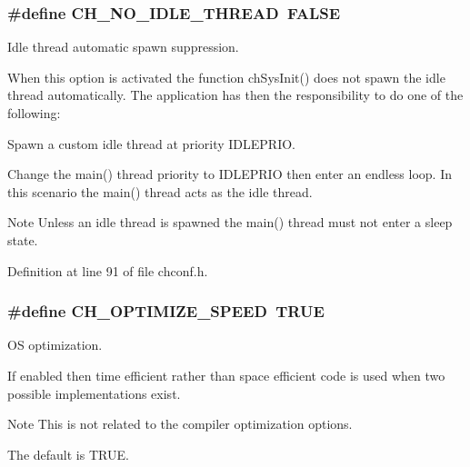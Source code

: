 \subsubsection[{C\+H\+\_\+\+N\+O\+\_\+\+I\+D\+L\+E\+\_\+\+T\+H\+R\+E\+A\+D}]{\setlength{\rightskip}{0pt plus 5cm}\#define C\+H\+\_\+\+N\+O\+\_\+\+I\+D\+L\+E\+\_\+\+T\+H\+R\+E\+A\+D~F\+A\+L\+S\+E}\label{group__config_gac7ceed3b75958cb6f7a977aab5ee249f}


Idle thread automatic spawn suppression. 

When this option is activated the function {\ttfamily ch\+Sys\+Init()} does not spawn the idle thread automatically. The application has then the responsibility to do one of the following\+:
\begin{DoxyItemize}
\item Spawn a custom idle thread at priority {\ttfamily I\+D\+L\+E\+P\+R\+I\+O}.
\item Change the main() thread priority to {\ttfamily I\+D\+L\+E\+P\+R\+I\+O} then enter an endless loop. In this scenario the {\ttfamily main()} thread acts as the idle thread.
\end{DoxyItemize}\begin{DoxyNote}{Note}
Unless an idle thread is spawned the {\ttfamily main()} thread must not enter a sleep state. 
\end{DoxyNote}


Definition at line 91 of file chconf.\+h.

\hypertarget{group__config_gaa5a3d403206b04dfa43ee769e8a220c6}{}
\subsubsection[{C\+H\+\_\+\+O\+P\+T\+I\+M\+I\+Z\+E\+\_\+\+S\+P\+E\+E\+D}]{\setlength{\rightskip}{0pt plus 5cm}\#define C\+H\+\_\+\+O\+P\+T\+I\+M\+I\+Z\+E\+\_\+\+S\+P\+E\+E\+D~T\+R\+U\+E}\label{group__config_gaa5a3d403206b04dfa43ee769e8a220c6}


O\+S optimization. 

If enabled then time efficient rather than space efficient code is used when two possible implementations exist.

\begin{DoxyNote}{Note}
This is not related to the compiler optimization options. 

The default is {\ttfamily T\+R\+U\+E}. 
\end{DoxyNote}


